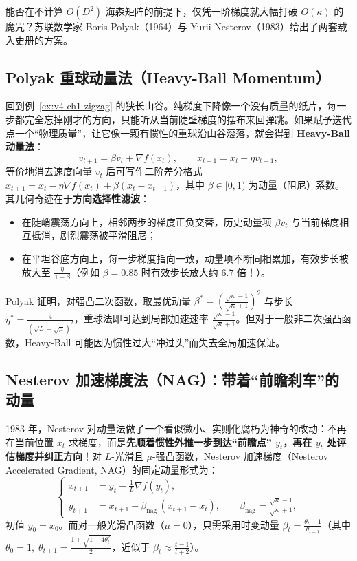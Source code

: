 能否在不计算 $O(D^2)$ 海森矩阵的前提下，仅凭一阶梯度就大幅打破 $O(\kappa)$ 的魔咒？苏联数学家 Boris Polyak（1964）与 Yurii Nesterov（1983）给出了两套载入史册的方案。

\subsection{Polyak 重球动量法（Heavy-Ball Momentum）}

回到例~\ref{ex:v4-ch1-zigzag} 的狭长山谷。纯梯度下降像一个没有质量的纸片，每一步都完全忘掉刚才的方向，只能听从当前陡壁梯度的摆布来回弹跳。如果赋予迭代点一个“物理质量”，让它像一颗有惯性的重球沿山谷滚落，就会得到 \textbf{Heavy-Ball 动量法}：
\begin{equation}\label{eq:v4-momentum}
  v_{t+1} = \beta v_t + \nabla f(x_t), \qquad x_{t+1} = x_t - \eta v_{t+1},
\end{equation}
等价地消去速度向量 $v_t$ 后可写作二阶差分格式 $x_{t+1} = x_t - \eta \nabla f(x_t) + \beta(x_t - x_{t-1})$，其中 $\beta \in [0, 1)$ 为动量（阻尼）系数。其几何奇迹在于\textbf{方向选择性滤波}：
\begin{itemize}
  \item 在陡峭震荡方向上，相邻两步的梯度正负交替，历史动量项 $\beta v_t$ 与当前梯度相互抵消，剧烈震荡被平滑阻尼；
  \item 在平坦谷底方向上，每一步梯度指向一致，动量项不断同相累加，有效步长被放大至 $\frac{\eta}{1-\beta}$（例如 $\beta = 0.85$ 时有效步长放大约 $6.7$ 倍！）。
\end{itemize}
Polyak 证明，对强凸二次函数，取最优动量 $\beta^* = \left(\frac{\sqrt{\kappa}-1}{\sqrt{\kappa}+1}\right)^2$ 与步长 $\eta^* = \frac{4}{(\sqrt{L}+\sqrt{\mu})^2}$，重球法即可达到局部加速速率 $\frac{\sqrt{\kappa}-1}{\sqrt{\kappa}+1}$。但对于一般非二次强凸函数，Heavy-Ball 可能因为惯性过大“冲过头”而失去全局加速保证。

\subsection{Nesterov 加速梯度法（NAG）：带着“前瞻刹车”的动量}

1983 年，Nesterov 对动量法做了一个看似微小、实则化腐朽为神奇的改动：不再在当前位置 $x_t$ 求梯度，而是\textbf{先顺着惯性外推一步到达“前瞻点” $y_t$，再在 $y_t$ 处评估梯度并纠正方向}！对 $L$-光滑且 $\mu$-强凸函数，Nesterov 加速梯度（Nesterov Accelerated Gradient, NAG）的固定动量形式为：
\begin{equation}\label{eq:v4-nag}
  \left\{
  \begin{aligned}
    x_{t+1} &= y_t - \frac{1}{L}\nabla f(y_t), \\
    y_{t+1} &= x_{t+1} + \beta_{\text{nag}}\,(x_{t+1} - x_t), \qquad \beta_{\text{nag}} = \frac{\sqrt{\kappa} - 1}{\sqrt{\kappa} + 1},
  \end{aligned}
  \right.
\end{equation}
初值 $y_0 = x_0$。而对一般光滑凸函数（$\mu = 0$），只需采用时变动量 $\beta_t = \frac{\theta_t - 1}{\theta_{t+1}}$（其中 $\theta_0 = 1,\; \theta_{t+1} = \frac{1 + \sqrt{1+4\theta_t^2}}{2}$，近似于 $\beta_t \approx \frac{t-1}{t+2}$）。

